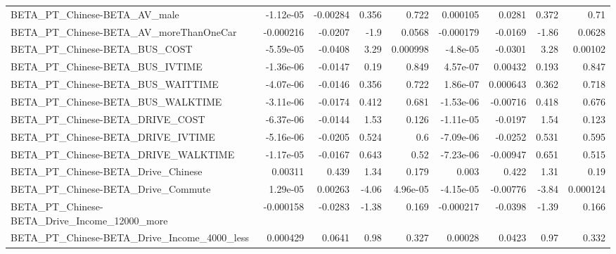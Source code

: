 \begin{tabular}{lrrrrrrrr}
BETA\_PT\_Chinese-BETA\_AV\_male                       &   -1.12e-05 &     -0.00284 &     0.356 &    0.722 &   0.000105 &      0.0281 &        0.372 &          0.71 \\
BETA\_PT\_Chinese-BETA\_AV\_moreThanOneCar             &   -0.000216 &      -0.0207 &      -1.9 &   0.0568 &  -0.000179 &     -0.0169 &        -1.86 &        0.0628 \\
BETA\_PT\_Chinese-BETA\_BUS\_COST                      &   -5.59e-05 &      -0.0408 &      3.29 & 0.000998 &   -4.8e-05 &     -0.0301 &         3.28 &       0.00102 \\
BETA\_PT\_Chinese-BETA\_BUS\_IVTIME                    &   -1.36e-06 &      -0.0147 &      0.19 &    0.849 &   4.57e-07 &     0.00432 &        0.193 &         0.847 \\
BETA\_PT\_Chinese-BETA\_BUS\_WAITTIME                  &   -4.07e-06 &      -0.0146 &     0.356 &    0.722 &   1.86e-07 &    0.000643 &        0.362 &         0.718 \\
BETA\_PT\_Chinese-BETA\_BUS\_WALKTIME                  &   -3.11e-06 &      -0.0174 &     0.412 &    0.681 &  -1.53e-06 &    -0.00716 &        0.418 &         0.676 \\
BETA\_PT\_Chinese-BETA\_DRIVE\_COST                    &   -6.37e-06 &      -0.0144 &      1.53 &    0.126 &  -1.11e-05 &     -0.0197 &         1.54 &         0.123 \\
BETA\_PT\_Chinese-BETA\_DRIVE\_IVTIME                  &   -5.16e-06 &      -0.0205 &     0.524 &      0.6 &  -7.09e-06 &     -0.0252 &        0.531 &         0.595 \\
BETA\_PT\_Chinese-BETA\_DRIVE\_WALKTIME                &   -1.17e-05 &      -0.0167 &     0.643 &     0.52 &  -7.23e-06 &    -0.00947 &        0.651 &         0.515 \\
BETA\_PT\_Chinese-BETA\_Drive\_Chinese                 &     0.00311 &        0.439 &      1.34 &    0.179 &      0.003 &       0.422 &         1.31 &          0.19 \\
BETA\_PT\_Chinese-BETA\_Drive\_Commute                 &    1.29e-05 &      0.00263 &     -4.06 & 4.96e-05 &  -4.15e-05 &    -0.00776 &        -3.84 &      0.000124 \\
BETA\_PT\_Chinese-BETA\_Drive\_Income\_12000\_more       &   -0.000158 &      -0.0283 &     -1.38 &    0.169 &  -0.000217 &     -0.0398 &        -1.39 &         0.166 \\
BETA\_PT\_Chinese-BETA\_Drive\_Income\_4000\_less        &    0.000429 &       0.0641 &      0.98 &    0.327 &    0.00028 &      0.0423 &         0.97 &         0.332 \\

\end{tabular}
